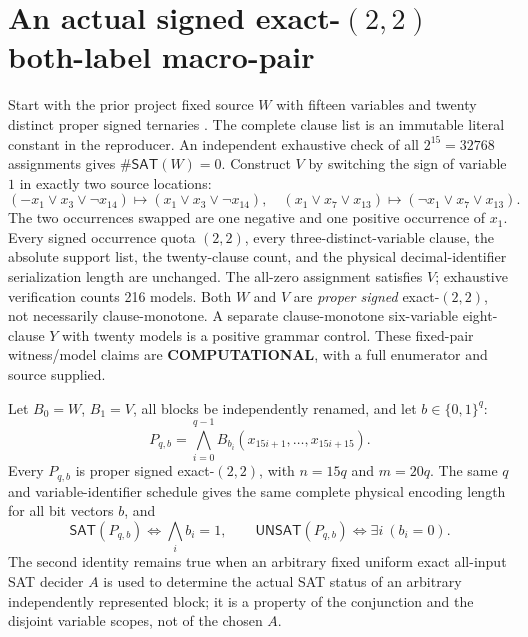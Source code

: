 \documentclass[11pt]{article}
\newcommand{\SAT}{\mathsf{SAT}}
\newcommand{\UNSAT}{\mathsf{UNSAT}}
\begin{document}
\section{An actual signed exact-$(2,2)$ both-label macro-pair}
Start with the prior project fixed source $W$ with fifteen variables and twenty distinct proper signed ternaries \cite{arc184}. The complete clause list is an immutable literal constant in the reproducer. An independent exhaustive check of all $2^{15}=32768$ assignments gives $\#\SAT(W)=0$. Construct $V$ by switching the sign of variable $1$ in exactly two source locations:
\[
(-x_1\vee x_3\vee\neg x_{14})\mapsto(x_1\vee x_3\vee\neg x_{14}),
\quad
(x_1\vee x_7\vee x_{13})\mapsto(\neg x_1\vee x_7\vee x_{13}).
\]
The two occurrences swapped are one negative and one positive occurrence of $x_1$. Every signed occurrence quota $(2,2)$, every three-distinct-variable clause, the absolute support list, the twenty-clause count, and the physical decimal-identifier serialization length are unchanged. The all-zero assignment satisfies $V$; exhaustive verification counts 216 models. Both $W$ and $V$ are \emph{proper signed} exact-$(2,2)$, not necessarily clause-monotone. A separate clause-monotone six-variable eight-clause $Y$ with twenty models is a positive grammar control. These fixed-pair witness/model claims are \textbf{COMPUTATIONAL}, with a full enumerator and source supplied.

Let $B_0=W$, $B_1=V$, all blocks be independently renamed, and let $b\in\{0,1\}^q$:
\[
P_{q,b}=\bigwedge_{i=0}^{q-1} B_{b_i}(x_{15i+1},\ldots,x_{15i+15}).\tag{2}
\]
Every $P_{q,b}$ is proper signed exact-$(2,2)$, with $n=15q$ and $m=20q$. The same $q$ and variable-identifier schedule gives the same complete physical encoding length for all bit vectors $b$, and
\[
\boxed{\SAT(P_{q,b})\iff\bigwedge_i b_i=1,
\qquad\UNSAT(P_{q,b})\iff\exists i\ (b_i=0).}\tag{3}
\]
The second identity remains true when an arbitrary fixed uniform exact all-input SAT decider $A$ is used to determine the actual SAT status of an arbitrary independently represented block; it is a property of the conjunction and the disjoint variable scopes, not of the chosen $A$.
\end{document}
